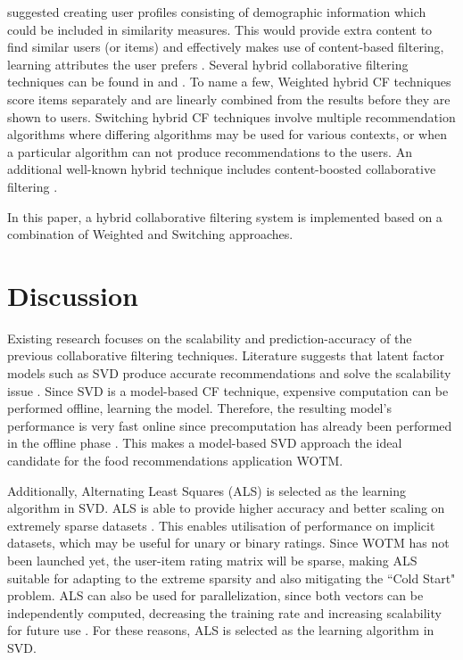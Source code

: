 \citeauthor{toward} \cite{toward} suggested creating user profiles consisting of demographic information which could be included in similarity measures. This would provide extra content to find similar users (or items) and effectively makes use of content-based filtering, learning attributes the user prefers \cite{toward}. Several hybrid collaborative filtering techniques can be found in \cite{toward} and \cite{spiegel2010hybrid}. To name a few, Weighted \cite{spiegel2010hybrid} hybrid CF techniques score items separately and are linearly combined from the results before they are shown to users. Switching \cite{spiegel2010hybrid} hybrid CF techniques involve multiple recommendation algorithms where differing algorithms may be used for various contexts, or when a particular algorithm can not produce recommendations to the users. An additional well-known hybrid technique includes content-boosted collaborative filtering \cite{hybrid}.

In this paper, a hybrid collaborative filtering system is implemented based on a combination of Weighted \cite{spiegel2010hybrid} and Switching \cite{spiegel2010hybrid} approaches. 

\section{Discussion}

Existing research focuses on the scalability and prediction-accuracy of the previous collaborative filtering techniques. Literature suggests that latent factor models such as SVD produce accurate recommendations and solve the scalability issue \cite{netflix_course, abergerrecommender, abergerrecommender}. Since SVD is a model-based CF technique, expensive computation can be performed offline, learning the model. Therefore, the resulting model's  performance is very fast online since precomputation has already been performed in the offline phase \cite{schafer2007collaborative}. This makes a model-based SVD approach the ideal candidate for the food recommendations application WOTM. 

Additionally, Alternating Least Squares (ALS) is selected as the learning algorithm in SVD. ALS is able to provide higher accuracy and better scaling on extremely sparse datasets \cite{abergerrecommender, koren2009matrix}. This enables utilisation of performance on implicit datasets, which may be useful for unary or binary ratings. Since WOTM has not been launched yet, the user-item rating matrix will be sparse, making ALS suitable for adapting to the extreme sparsity and also mitigating the ``Cold Start" problem. ALS can also be used for parallelization, since both vectors can be independently computed, decreasing the training rate and increasing scalability for future use \cite{koren2009matrix}. For these reasons, ALS is selected as the learning algorithm in SVD. 

